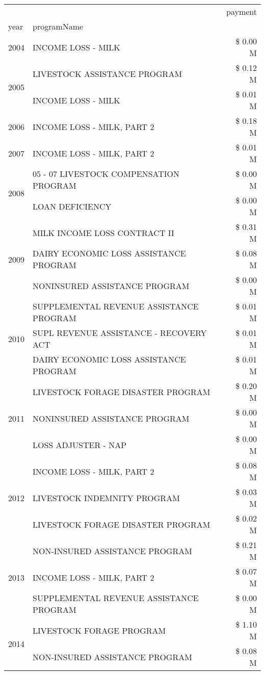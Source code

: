 \begin{tabular}{llr}
\toprule
 &  & payment \\
year & programName &  \\
\midrule
2004 & INCOME LOSS - MILK & \$ 0.00 M \\
\cline{1-3}
\multirow[t]{2}{*}{2005} & LIVESTOCK ASSISTANCE PROGRAM & \$ 0.12 M \\
 & INCOME LOSS - MILK & \$ 0.01 M \\
\cline{1-3}
2006 & INCOME LOSS - MILK, PART 2 & \$ 0.18 M \\
\cline{1-3}
2007 & INCOME LOSS - MILK, PART 2 & \$ 0.01 M \\
\cline{1-3}
\multirow[t]{2}{*}{2008} & 05 - 07 LIVESTOCK COMPENSATION PROGRAM & \$ 0.00 M \\
 & LOAN DEFICIENCY & \$ 0.00 M \\
\cline{1-3}
\multirow[t]{3}{*}{2009} & MILK INCOME LOSS CONTRACT II & \$ 0.31 M \\
 & DAIRY ECONOMIC LOSS ASSISTANCE PROGRAM & \$ 0.08 M \\
 & NONINSURED ASSISTANCE PROGRAM & \$ 0.00 M \\
\cline{1-3}
\multirow[t]{3}{*}{2010} & SUPPLEMENTAL REVENUE ASSISTANCE PROGRAM & \$ 0.01 M \\
 & SUPL REVENUE ASSISTANCE - RECOVERY ACT & \$ 0.01 M \\
 & DAIRY ECONOMIC LOSS ASSISTANCE PROGRAM & \$ 0.01 M \\
\cline{1-3}
\multirow[t]{3}{*}{2011} & LIVESTOCK FORAGE DISASTER PROGRAM & \$ 0.20 M \\
 & NONINSURED ASSISTANCE PROGRAM & \$ 0.00 M \\
 & LOSS ADJUSTER - NAP & \$ 0.00 M \\
\cline{1-3}
\multirow[t]{3}{*}{2012} & INCOME LOSS - MILK, PART 2 & \$ 0.08 M \\
 & LIVESTOCK INDEMNITY PROGRAM & \$ 0.03 M \\
 & LIVESTOCK FORAGE DISASTER PROGRAM & \$ 0.02 M \\
\cline{1-3}
\multirow[t]{3}{*}{2013} & NON-INSURED ASSISTANCE PROGRAM & \$ 0.21 M \\
 & INCOME LOSS - MILK, PART 2 & \$ 0.07 M \\
 & SUPPLEMENTAL REVENUE ASSISTANCE PROGRAM & \$ 0.00 M \\
\cline{1-3}
\multirow[t]{3}{*}{2014} & LIVESTOCK FORAGE PROGRAM & \$ 1.10 M \\
 & NON-INSURED ASSISTANCE PROGRAM & \$ 0.08 M \\

\end{tabular}
